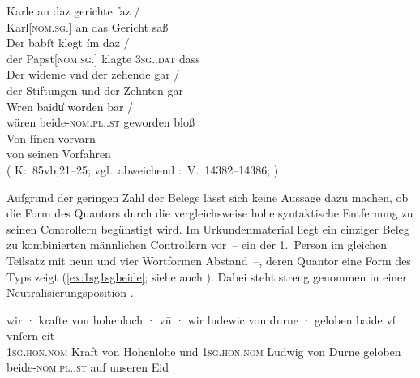 \begin{exe}
\ex \label{ex:baideuwarn3}
	\gll Karle an daz gerichte ſaz {/} \\
	    Karl[\textsc{nom.sg.\MascM}] an das Gericht saß \\
	\gll Der babſt klegt ím daz {/} \\
		der Papst[\textsc{nom.sg.\MascM}] klagte \textsc{3sg.\MascM.dat} dass \\
	\gll Der wideme vnd der zehende gar {/} \\
		der Stiftungen und der Zehnten gar \\
	\gll Wren baidu̍ worden bar {/} \\
		wären beide-\textsc{nom.pl.\NeutM.st} geworden bloß \\
	\gll Von ſínen vorvarn \\
		von seinen Vorfahren \\
	\trans {}
		(%
			K:~85vb,21--25; vgl.~abweichend
			\KC:~V.~14382--14386;
			\cite[341]{schroeder1895}%
		)
\end{exe}

Aufgrund der geringen Zahl der Belege lässt sich keine Aussage dazu machen, ob
die Form des Quantors durch die vergleichsweise hohe syntaktische Entfernung zu
seinen Controllern begünstigt wird. Im Urkundenmaterial liegt ein einziger
Beleg zu kombinierten männlichen Controllern vor~-- ein 
der 1.~Person im gleichen Teilsatz mit neun und vier Wortformen
Abstand~--, deren Quantor eine Form des Typs 
zeigt (\ref{ex:1sg1sgbeide}; siehe auch ). Dabei steht
 streng genommen in einer Neutralisierungsposition
\autocites[vgl.][90--91]{askedal1973}[191]{gjelsten1980}.

\begin{exe}
\ex\label{ex:1sg1sgbeide}
	\gll wir · krafte von hohenloch · vn̄ · wir
		ludewic von durne · geloben baide vf vnſern eit \\
		\textsc{1sg\subM.hon.nom} {} Kraft von Hohenlohe {} und {}
		\textsc{1sg\subM.hon.nom} Ludwig von Durne {} geloben
		beide-\textsc{nom.pl.\MascM.st} auf unseren Eid \\
	\trans {}
		\parencites(Nr.~2529, Burg Hohlach, Kr.~Neustadt an der Aisch-Bad Windsheim, 1296)[563,5--6]{cao3}%
\end{exe}

